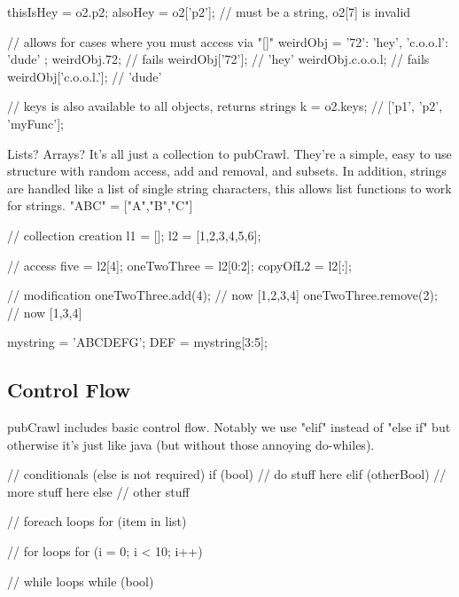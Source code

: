 \documentclass[letterpaper]{article}
\begin{document}
\begin{mdframed}[hidealllines=true,backgroundcolor=gray!10,skipbelow=1em,skipabove=.5em]
\begin{code}
thisIsHey = o2.p2;
alsoHey = o2['p2']; // must be a string, o2[7] is invalid

// allows for cases where you must access via "[]"
weirdObj = {
	'72': 'hey',
    'c.o.o.l': 'dude'
};
weirdObj.72; // fails
weirdObj['72']; // 'hey'
weirdObj.c.o.o.l; // fails
weirdObj['c.o.o.l.']; // 'dude'

// keys is also available to all objects, returns strings
k = o2.keys; // ['p1', 'p2', 'myFunc'];
\end{code}
\end{mdframed}
Lists? Arrays? It's all just a collection to pubCrawl. They're a simple, easy to use structure with random access, add and removal, and subsets. In addition, strings are handled like a list of single string characters, this allows list functions to work for strings. "ABC" = ["A","B","C"]
\begin{mdframed}[hidealllines=true,backgroundcolor=gray!10,skipbelow=1em,skipabove=.5em]
\begin{code}
// collection creation
l1 = [];
l2 = [1,2,3,4,5,6];

// access
five = l2[4];
oneTwoThree = l2[0:2];
copyOfL2 = l2[:];

// modification
oneTwoThree.add(4); // now [1,2,3,4]
oneTwoThree.remove(2); // now [1,3,4]

mystring = 'ABCDEFG';
DEF = mystring[3:5];
\end{code}
\end{mdframed}
\subsection{Control Flow}
pubCrawl includes basic control flow. Notably we use "elif" instead of "else if" but otherwise it's just like java (but without those annoying do-whiles).

\begin{mdframed}[hidealllines=true,backgroundcolor=gray!10,skipbelow=4em,skipabove=.5em]
\begin{code}
// conditionals (else is not required)
if (bool) {
// do stuff here
}
elif (otherBool) {
// more stuff here
}
else {
// other stuff
}

// foreach loops
for (item in list) {

}

// for loops
for (i = 0; i < 10; i++) {

}

// while loops
while (bool) {

}
\end{code}
\end{mdframed}
\end{document}

